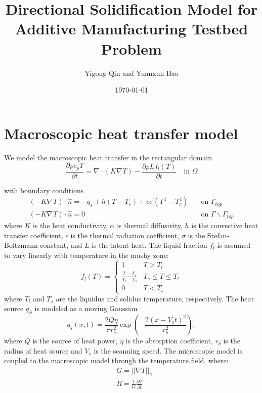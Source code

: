\documentclass[a4paper,12pt]{article}
\title{Directional Solidification Model for Additive Manufacturing Testbed Problem}
\author{Yigong Qin and Yuanxun Bao}
\date{\today}
\renewcommand{\div}[1]{\nabla_{#1} \cdot}
\newcommand{\grad}[1]{\nabla_{#1}}
\begin{document}
\maketitle

\section{Macroscopic heat transfer model}
We model the macroscopic heat transfer in the rectangular domain 
\begin{equation}
\frac{\partial \rho c_{p} T}{ \partial t} = \div{} ( K \grad{} T) -\frac{\partial \rho L  f_l(T)}{\partial t} \quad \text{in }  \Omega
\end{equation}

with boundary conditions 
\begin{align}
(-K \grad{} T) \cdot \hat{n} = -q_s + h(T - T_e) + \epsilon \sigma (T^4 - T_e^4)  & \quad \text{on } \Gamma_{top} \\
(-K \grad{} T) \cdot \hat{n} = 0  & \quad \text{on } \Gamma  \backslash \Gamma_{top}
\end{align}
where $K$ is the heat conductivity, $\alpha$ is thermal diffusivity, $h$ is the convective heat transfer coefficient, $\epsilon$ is the thermal radiation coefficient, $\sigma$ is the Stefan-Boltzmann constant, and $L$ is the latent heat. The liquid fraction $f_l$ is assumed to vary linearly with temperature in the mushy zone:
\begin{equation}
f_l(T) =
\left\{
\begin{array}{cc}
1 & T>T_l \\
\frac{T-T_s}{T_l - T_s} & T_s \leq T \leq T_l \\
0 & T < T_s
\end{array}
\right.
\end{equation}
where $T_l$ and $T_s$ are the liquidus and solidus temperature, respectively.
The heat source $q_S$ is modeled as a moving Gaussian
\begin{equation}
q_s(x, t ) = \frac{2Q\eta}{\pi r_b^2} \exp \left( -\frac{ 2(x-V_s t)^2}{ r_b^2} \right),
\end{equation}
where $Q$ is the source of heat power, $\eta$ is the absorption coefficient, $r_b$ is the radius of heat source and $V_s$ is the scanning speed.  
The microscopic model  is coupled to the macroscopic model through the temperature field, where:
\begin{align}
    &G = ||\nabla {T}||_2 \\
    &R = \frac{1}{G}\frac{\partial {T}}{\partial t}
\end{align}
\end{document}
